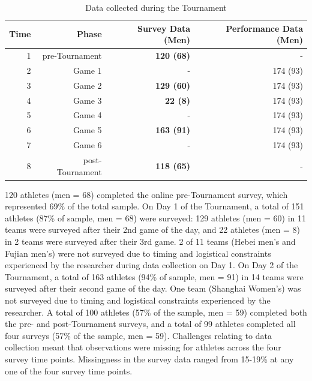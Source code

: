       \begin{table}[htbp]\caption{Data collected during the Tournament}
        \begin{center}
          \begin{small}
            \begin{tabular}{r r r r}
                Time & Phase & Survey Data (Men) & Performance Data (Men) \\
                \hline\hline
                1 & pre-Tournament & \bf 120 (68) & - \\
                2 & Game 1 & - & 174 (93) \\
                3 & Game 2 & \bf129 (60) & 174 (93) \\
                4 & Game 3 & \bf22 (8) & 174 (93) \\
                \hline
                5 & Game 4 & - & 174 (93) \\
                6 & Game 5 & \bf 163 (91) & 174 (93) \\
                7 & Game 6 & - & 174 (93) \\
                8 & post-Tournament & \bf118 (65) & - \\
                \hline
            \end{tabular}
          \end{small}
        \end{center}
        \label{tab:tournamentData}
      \end{table}

120 athletes (men = 68) completed the online pre-Tournament survey, which represented 69\% of the total sample. On Day 1 of the Tournament, a total of 151 athletes (87\% of sample, men = 68) were surveyed: 129 athletes (men = 60) in 11 teams were surveyed after their 2nd game of the day, and 22 athletes (men = 8) in 2 teams were surveyed after their 3rd game. 2 of 11 teams (Hebei men’s and Fujian men’s) were not surveyed due to timing and logistical constraints experienced by the researcher during data collection on Day 1. On Day 2 of the Tournament, a total of 163 athletes (94\% of sample, men = 91) in 14 teams were surveyed after their second game of the day. One team (Shanghai Women’s) was not surveyed due to timing and logistical constraints experienced by the researcher. A total of 100 athletes (57\% of the sample, men = 59) completed both the pre- and post-Tournament surveys, and a total of 99 athletes completed all four surveys (57\% of the sample, men = 59). Challenges relating to data collection meant that observations were missing for athletes across the four survey time points. Missingness in the survey data ranged from 15-19\% at any one of the four survey time points.\\





